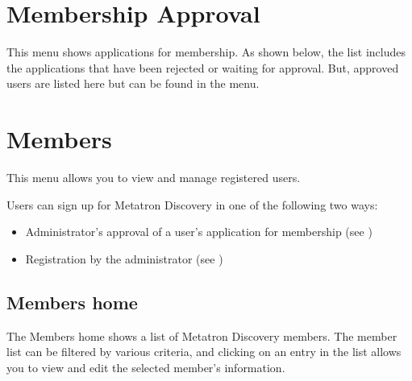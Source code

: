 \documentclass[letterpaper,10pt,english]{sphinxmanual}
\begin{document}
\section{Membership Approval}
\label{\detokenize{discovery/part08/membership_approval:membership-approval}}\label{\detokenize{discovery/part08/membership_approval:id1}}\label{\detokenize{discovery/part08/membership_approval::doc}}
This menu shows applications for membership. As shown below, the list includes the applications that have been rejected or waiting for approval. But, approved users are listed here but can be found in the  menu.
\begin{quote}

\begin{figure}[H]
\centering

\noindent{}
\end{figure}
\end{quote}


\section{Members}
\label{\detokenize{discovery/part08/members:id1}}\label{\detokenize{discovery/part08/members::doc}}
This menu allows you to view and manage registered users.

Users can sign up for Metatron Discovery in one of the following two ways:
\begin{itemize}
\item {} 
Administrator’s approval of a user’s application for membership (see {\hyperref[\detokenize{discovery/part08/membership_approval:membership-approval}]{}} )

\item {} 
Registration by the administrator (see {\hyperref[\detokenize{discovery/part08/members:user-registration}]{}})

\end{itemize}


\subsection{Members home}
\label{\detokenize{discovery/part08/members:id2}}
The Members home shows a list of Metatron Discovery members. The member list can be filtered by various criteria, and clicking on an entry in the list allows you to view and edit the selected member’s information.
\begin{quote}

\begin{figure}[H]
\centering

\noindent{}
\end{figure}
\end{quote}
\end{document}
